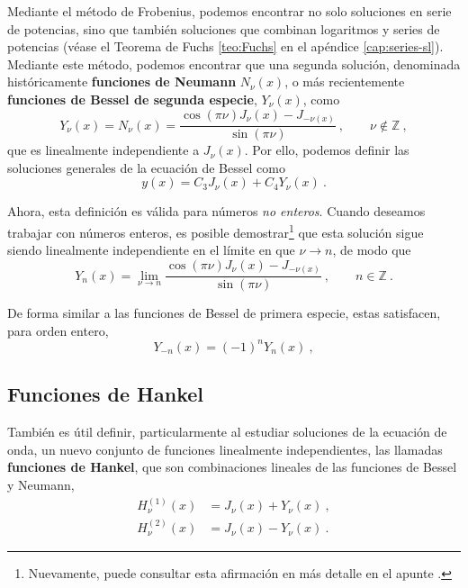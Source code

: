 Mediante el método de Frobenius, podemos encontrar no solo soluciones en serie de potencias, sino que también soluciones que combinan logaritmos y series de potencias (véase el Teorema de Fuchs \ref{teo:Fuchs} en el apéndice \ref{cap:series-sl}). Mediante este método, podemos encontrar que una segunda solución, denominada históricamente \textbf{funciones de Neumann} $N_\nu(x)$, o más recientemente \textbf{funciones de Bessel de segunda especie}, $Y_\nu(x)$, como
\begin{equation}
    Y_\nu(x) = N_\nu(x) = \frac{\cos(\pi \nu) J_\nu(x) - J_{-\nu(x)}}{\sin(\pi \nu)} \ , \qquad \nu \notin \mathbb{Z} \ ,
\end{equation}
que es linealmente independiente a $J_\nu(x)$. Por ello, podemos definir las soluciones generales de la ecuación de Bessel como
\begin{equation}
    y(x) = C_3 J_\nu(x) + C_4 Y_\nu(x) \ .
\end{equation}

Ahora, esta definición es válida para números \emph{no enteros}. Cuando deseamos trabajar con números enteros, es posible demostrar\footnote{Nuevamente, puede consultar esta afirmación en más detalle en el apunte \cite{Rubilar}.} que esta solución sigue siendo linealmente independiente en el límite en que $\nu \to n$, de modo que
\begin{equation}
    Y_n(x) = \lim_{\nu \to n} \frac{\cos(\pi \nu) J_\nu(x) - J_{-\nu(x)}}{\sin(\pi \nu)} \ , \qquad n \in \mathbb{Z} \ .
\end{equation}

De forma similar a las funciones de Bessel de primera especie, estas satisfacen, para orden entero, 
\begin{equation}
    Y_{-n}(x) = (-1)^n Y_n(x) \ ,
\end{equation}

\subsection{Funciones de Hankel}

También es útil definir, particularmente al estudiar soluciones de la ecuación de onda,  un nuevo conjunto de funciones linealmente independientes, las llamadas \textbf{funciones de Hankel}, que son combinaciones lineales de las funciones de Bessel y Neumann,
\begin{align}
    H_\nu^{(1)}(x) & = J_\nu(x) + Y_\nu(x) \ , \\
    H_\nu^{(2)}(x) & = J_\nu(x) - Y_\nu(x) \ .
\end{align}

